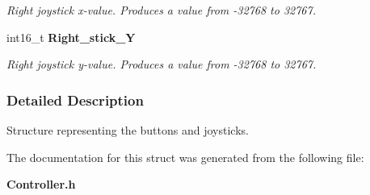 \begin{DoxyCompactItemize}
\begin{DoxyCompactList}\small\item\em Right joystick x-\/value. Produces a value from -\/32768 to 32767. \end{DoxyCompactList}\item 
int16\-\_\-t {\bf Right\-\_\-stick\-\_\-\-Y}\label{struct_buttons_acabf34ad61f696e479607ca456f25fc4}

\begin{DoxyCompactList}\small\item\em Right joystick y-\/value. Produces a value from -\/32768 to 32767. \end{DoxyCompactList}\end{DoxyCompactItemize}


\subsubsection{Detailed Description}
Structure representing the buttons and joysticks. 

The documentation for this struct was generated from the following file\-:\begin{DoxyCompactItemize}
\item 
{\bf Controller.\-h}\end{DoxyCompactItemize}
